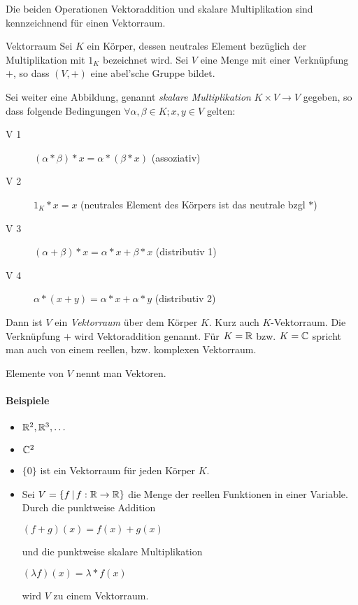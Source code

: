 Die beiden Operationen Vektoraddition und skalare Multiplikation sind kennzeichnend für einen Vektorraum.


\begin{definition}{Vektorraum}
	Sei $K$ ein Körper, dessen neutrales Element bezüglich der Multiplikation mit $1_K$ bezeichnet wird. Sei $V$ eine Menge mit einer Verknüpfung $+$, so dass $(V,+)$ eine abel'sche Gruppe bildet.

	Sei weiter eine Abbildung, genannt \emph{skalare Multiplikation} $K\times V\rightarrow V$ gegeben, so dass folgende Bedingungen $\forall \alpha,\beta \in K; x,y\in V$ gelten:

	\begin{description}
	  \item[V 1] $(\alpha*\beta)* x=\alpha*(\beta* x)$ (assoziativ)
	  \item[V 2] $1_K* x = x$ (neutrales Element des Körpers ist das neutrale bzgl $*$)
	  \item[V 3] $(\alpha+\beta)* x=\alpha * x + \beta* x$ (distributiv 1)
	  \item[V 4] $\alpha* (x+y)=\alpha * x + \alpha* y$ (distributiv 2)
	\end{description}
	Dann ist $V$ ein \emph{Vektorraum} über dem Körper $K$. Kurz auch $K$-Vektorraum. Die Verknüpfung $+$ wird Vektoraddition genannt. Für $K=\mathbb{R}$ bzw. $K=\mathbb{C}$ spricht man auch von einem reellen, bzw. komplexen Vektorraum.

	Elemente von $V$ nennt man Vektoren.
\end{definition}

\paragraph{Beispiele}
\begin{multicols}{2}
  \begin{itemize}
    \item $\mathbb{R}^2, \mathbb{R}^3, \ldots$
    \item $\mathbb{C}^2$
    \item $\{0\}$ ist ein Vektorraum für jeden Körper $K$.
    \columnbreak
    \item Sei $V=\left\{ f \,\middle|\, f:\mathbb{R}\rightarrow\mathbb{R} \right\}$ die Menge der reellen Funktionen in einer Variable. Durch die punktweise Addition

    $(f+g)(x)=f(x)+g(x)$

    und die punktweise skalare Multiplikation

    $(\lambda f)(x)=\lambda* f(x)$

    wird $V$ zu einem Vektorraum.
  \end{itemize}
\end{multicols}


